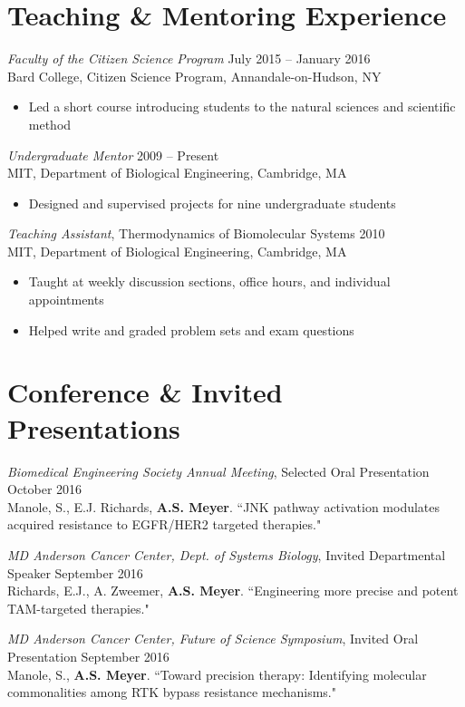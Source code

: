 \documentclass[11pt]{res}
\begin{document}
\begin{resume}
\section{Teaching \& Mentoring Experience}

{\sl Faculty of the Citizen Science Program} \hfill July 2015 -- January 2016 \\
Bard College, Citizen Science Program, Annandale-on-Hudson, NY	
\begin{itemize}
\item Led a short course introducing students to the natural sciences and scientific method
\end{itemize}

\clearpage
{\sl Undergraduate Mentor} \hfill 2009 -- Present \\
MIT, Department of Biological Engineering, Cambridge, MA
\begin{itemize}
\item Designed and supervised projects for nine undergraduate students
\end{itemize}

{\sl Teaching Assistant}, Thermodynamics of Biomolecular Systems \hfill 2010 \\
MIT, Department of Biological Engineering, Cambridge, MA
\begin{itemize}
\item Taught at weekly discussion sections, office hours, and individual appointments
\item Helped write and graded problem sets and exam questions
\end{itemize}

\section{Conference \& Invited Presentations}

{\sl Biomedical Engineering Society Annual Meeting}, Selected Oral Presentation \hfill October 2016 \\
Manole, S., E.J. Richards, {\bf A.S. Meyer}. ``JNK pathway activation modulates acquired resistance to EGFR/HER2 targeted therapies."

{\sl MD Anderson Cancer Center, Dept. of Systems Biology}, Invited Departmental Speaker \hfill September 2016 \\
Richards, E.J., A. Zweemer, {\bf A.S. Meyer}. ``Engineering more precise and potent TAM-targeted therapies."

{\sl MD Anderson Cancer Center, Future of Science Symposium}, Invited Oral Presentation \hfill September 2016 \\
Manole, S., {\bf A.S. Meyer}. ``Toward precision therapy: Identifying molecular commonalities among RTK bypass resistance mechanisms."


\end{resume}
\end{document}
